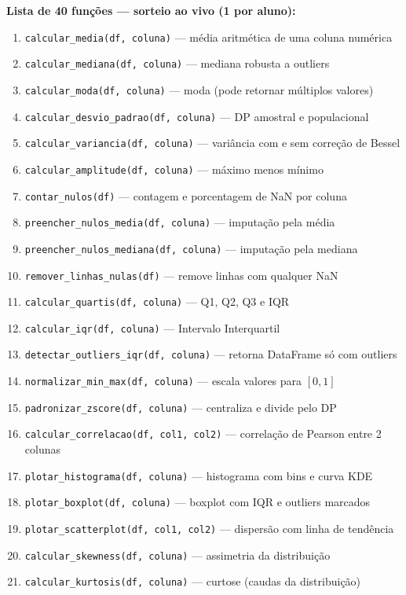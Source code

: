 \begin{BoardBox}
\textbf{Lista de 40 funções — sorteio ao vivo (1 por aluno):}
\begin{enumerate}
  \item \texttt{calcular\_media(df, coluna)} — média aritmética de uma coluna numérica
  \item \texttt{calcular\_mediana(df, coluna)} — mediana robusta a outliers
  \item \texttt{calcular\_moda(df, coluna)} — moda (pode retornar múltiplos valores)
  \item \texttt{calcular\_desvio\_padrao(df, coluna)} — DP amostral e populacional
  \item \texttt{calcular\_variancia(df, coluna)} — variância com e sem correção de Bessel
  \item \texttt{calcular\_amplitude(df, coluna)} — máximo menos mínimo
  \item \texttt{contar\_nulos(df)} — contagem e porcentagem de NaN por coluna
  \item \texttt{preencher\_nulos\_media(df, coluna)} — imputação pela média
  \item \texttt{preencher\_nulos\_mediana(df, coluna)} — imputação pela mediana
  \item \texttt{remover\_linhas\_nulas(df)} — remove linhas com qualquer NaN
  \item \texttt{calcular\_quartis(df, coluna)} — Q1, Q2, Q3 e IQR
  \item \texttt{calcular\_iqr(df, coluna)} — Intervalo Interquartil
  \item \texttt{detectar\_outliers\_iqr(df, coluna)} — retorna DataFrame só com outliers
  \item \texttt{normalizar\_min\_max(df, coluna)} — escala valores para $[0, 1]$
  \item \texttt{padronizar\_zscore(df, coluna)} — centraliza e divide pelo DP
  \item \texttt{calcular\_correlacao(df, col1, col2)} — correlação de Pearson entre 2 colunas
  \item \texttt{plotar\_histograma(df, coluna)} — histograma com bins e curva KDE
  \item \texttt{plotar\_boxplot(df, coluna)} — boxplot com IQR e outliers marcados
  \item \texttt{plotar\_scatterplot(df, col1, col2)} — dispersão com linha de tendência
  \item \texttt{calcular\_skewness(df, coluna)} — assimetria da distribuição
  \item \texttt{calcular\_kurtosis(df, coluna)} — curtose (caudas da distribuição)

\end{enumerate}
\end{BoardBox}
